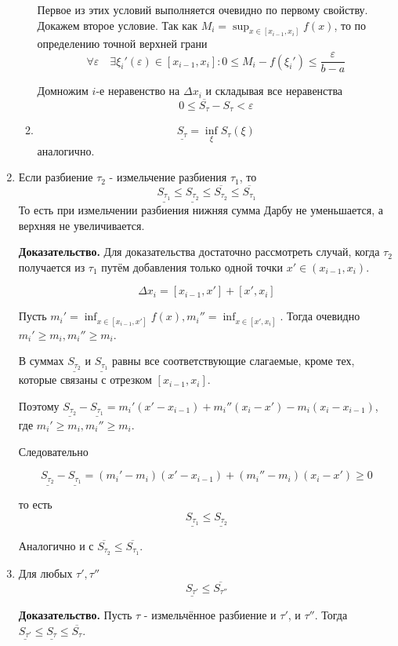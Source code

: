\documentclass[a4paper]{article}
\begin{document}
\begin{definit}
\begin{enumerate}
\begin{enumerate}
Первое из этих условий выполняется очевидно по первому свойству. Докажем второе условие. Так как $M_i = \sup_{x \in [x_{i-1}, x_i]} f(x)$, то по определению точной верхней грани 
\[
\forall \varepsilon \quad \exists \xi_i'(\varepsilon) \in [x_{i-1}, x_i]: 0 \leq M_i - f(\xi_i') \leq \frac{\varepsilon}{b-a}
\]

Домножим $i$-е неравенство на $\Delta x_i$ и складывая все неравенства
\[
0 \leq \overline{S_\tau} - S_\tau < \varepsilon
\]

\item \[\underline{S_\tau} = \inf_{\xi} S_\tau(\xi)\] аналогично.
\end{enumerate}

\item Если разбиение $\tau_2$ - измельчение разбиения $\tau_1$, то 
\[
\underline{S_{\tau_1}} \leq \underline{S_{\tau_2}} \leq \overline{S_{\tau_2}} \leq \overline{S_{\tau_1}}
\]
То есть при измельчении разбиения нижняя сумма Дарбу не уменьшается, а верхняя не увеличивается.

\textbf{Доказательство.} Для доказательства достаточно рассмотреть случай, когда $\tau_2$ получается из $\tau_1$ путём добавления только одной точки $x' \in (x_{i-1}, x_i)$.

\[ \Delta x_i = [x_{i-1}, x'] + [x', x_i] \]

Пусть $m_i' = \inf_{x \in [x_{i-1}, x']} f(x), m_i'' = \inf_{x \in [x', x_{i}]}$. Тогда очевидно $m_i' \geq m_i, m_i'' \geq m_i$.

В суммах $\underline{S_{\tau_2}}$ и $\underline{S_{\tau_1}}$ равны все соответствующие слагаемые, кроме тех, которые связаны с отрезком $[x_{i-1}, x_i]$.

Поэтому $\underline{S_{\tau_2}} - \underline{S_{\tau_1}} = m_i'(x'-x_{i-1}) + m_i''(x_i-x') - m_i(x_i-x_{i-1})$, где $m_i' \geq m_i, m_i'' \geq m_i$.

Следовательно 

\[
\underline{S_{\tau_2}} - \underline{S_{\tau_1}} = (m_i' - m_i)(x'-x_{i-1}) + (m_i'' - m_i) (x_i-x') \geq 0
\]

то есть \[\underline{S_{\tau_1}} \leq \underline{S_{\tau_2}}\]

Аналогично и с $\overline{S_{\tau_2}} \leq \overline{S_{\tau_1}}$.

\item Для любых $\tau', \tau''$ 
\[
\underline{S_{\tau'}} \leq \overline{S_{\tau''}}
\]

\textbf{Доказательство.} Пусть $\tau$ - измельчённое разбиение и $\tau'$, и $\tau''$. Тогда $\underline{S_{\tau'}} \leq \underline{S_\tau} \leq \overline{S_\tau}.$


\end{enumerate}
\end{definit}
\end{document}
